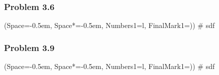 \documentclass[12pt, a4paper]{article}
\newcommand{\listSpace}{-0.5em}%
\begin{document}
\subsubsection*{Problem 3.6}
\begin{easylist}[enumerate]
	\ListProperties(Space=\listSpace, Space*=\listSpace, Numbers1=l, FinalMark1={)})
	# sdf
\end{easylist}

\subsubsection*{Problem 3.9}
\begin{easylist}[enumerate]
	\ListProperties(Space=\listSpace, Space*=\listSpace, Numbers1=l, FinalMark1={)})
	# sdf
\end{easylist}
\end{document}
